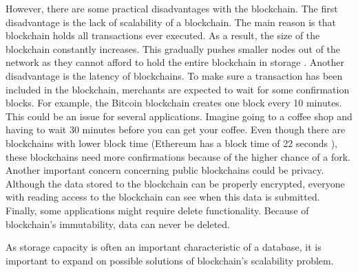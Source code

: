 However, there are some practical disadvantages with the blockchain. The first disadvantage is the lack of scalability of a blockchain. The main reason is that blockchain holds all transactions ever executed. As a result, the size of the blockchain constantly increases. This gradually pushes smaller nodes out of the network as they cannot afford to hold the entire blockchain in storage \cite{blockchain-scalability}. Another disadvantage is the latency of blockchains. To make sure a transaction has been included in the blockchain, merchants are expected to wait for some confirmation blocks. For example, the Bitcoin blockchain creates one block every 10 minutes. This could be an issue for several applications. Imagine going to a coffee shop and having to wait 30 minutes before you can get your coffee. Even though there are blockchains with lower block time (Ethereum has a block time of 22 seconds \cite{Ethereum-block-time}), these blockchains need more confirmations because of the higher chance of a fork. Another important concern concerning public blockchains could be privacy. Although the data stored to the blockchain can be properly encrypted, everyone with reading access to the blockchain can see when this data is submitted. Finally, some applications might require delete functionality. Because of blockchain's immutability, data can never be deleted.

As storage capacity is often an important characteristic of a database, it is important to expand on possible solutions of blockchain's scalability problem. 

